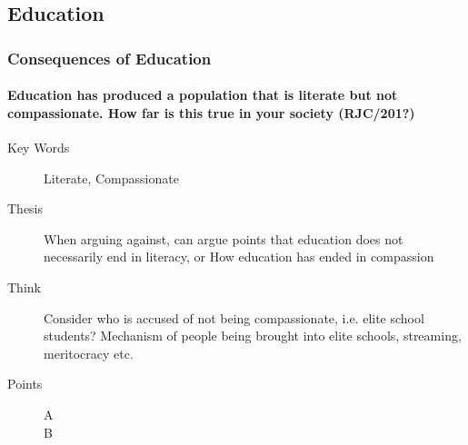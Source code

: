 \documentclass[../../main]{subfiles}
\begin{document}
\subsection{Education}

\subsubsection{Consequences of Education}

	\paragraph{Education has produced a population that is literate but not compassionate. How far is this true in your society (RJC/201?)}
	\begin{description}
		\item[Key Words] Literate, Compassionate
		\item[Thesis] When arguing against, can argue points that education does not necessarily end in literacy, or How education has ended in compassion
		\item[Think] Consider who is accused of not being compassionate, i.e. elite school students? Mechanism of people being brought into elite schools, streaming, meritocracy etc.
		\item[Points] \hfill
			\begin{description}
				\item[A] 
				\item[B] 
			\end{description}
	\end{description}
\end{document}
